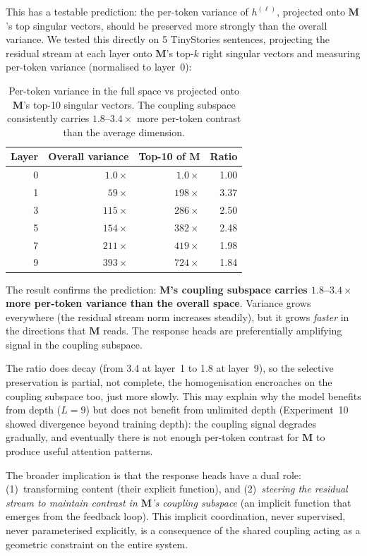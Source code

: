 \documentclass[11pt, a4paper]{article}
\newcommand{\M}{\mathbf{M}}
\theoremstyle{plain}
\theoremstyle{remark}
\begin{document}
This has a testable prediction: the per-token variance of $h^{(\ell)}$, projected onto $\M$'s top singular vectors, should be preserved more strongly than the overall variance.
We tested this directly on 5 TinyStories sentences, projecting the residual stream at each layer onto $\M$'s top-$k$ right singular vectors and measuring per-token variance (normalised to layer~0):

\begin{table}[h]
\centering\small
\begin{tabular}{@{}rrrr@{}}
\toprule
\textbf{Layer} & \textbf{Overall variance} & \textbf{Top-10 of $\M$} & \textbf{Ratio} \\
\midrule
0 & $1.0\times$ & $1.0\times$ & 1.00 \\
1 & $59\times$ & $198\times$ & 3.37 \\
3 & $115\times$ & $286\times$ & 2.50 \\
5 & $154\times$ & $382\times$ & 2.48 \\
7 & $211\times$ & $419\times$ & 1.98 \\
9 & $393\times$ & $724\times$ & 1.84 \\
\bottomrule
\end{tabular}
\caption{Per-token variance in the full space vs projected onto $\M$'s top-10 singular vectors. The coupling subspace consistently carries $1.8$--$3.4\times$ more per-token contrast than the average dimension.}
\end{table}

The result confirms the prediction: \textbf{$\M$'s coupling subspace carries $1.8$--$3.4\times$ more per-token variance than the overall space}.
Variance grows everywhere (the residual stream norm increases steadily), but it grows \emph{faster} in the directions that $\M$ reads.
The response heads are preferentially amplifying signal in the coupling subspace.

The ratio does decay (from 3.4 at layer~1 to 1.8 at layer~9), so the selective preservation is partial, not complete, the homogenisation encroaches on the coupling subspace too, just more slowly.
This may explain why the model benefits from depth ($L{=}9$) but does not benefit from unlimited depth (Experiment~10 showed divergence beyond training depth): the coupling signal degrades gradually, and eventually there is not enough per-token contrast for $\M$ to produce useful attention patterns.

The broader implication is that the response heads have a dual role: (1)~transforming content (their explicit function), and (2)~\emph{steering the residual stream to maintain contrast in $\M$'s coupling subspace} (an implicit function that emerges from the feedback loop).
This implicit coordination, never supervised, never parameterised explicitly, is a consequence of the shared coupling acting as a geometric constraint on the entire system.
\end{document}
